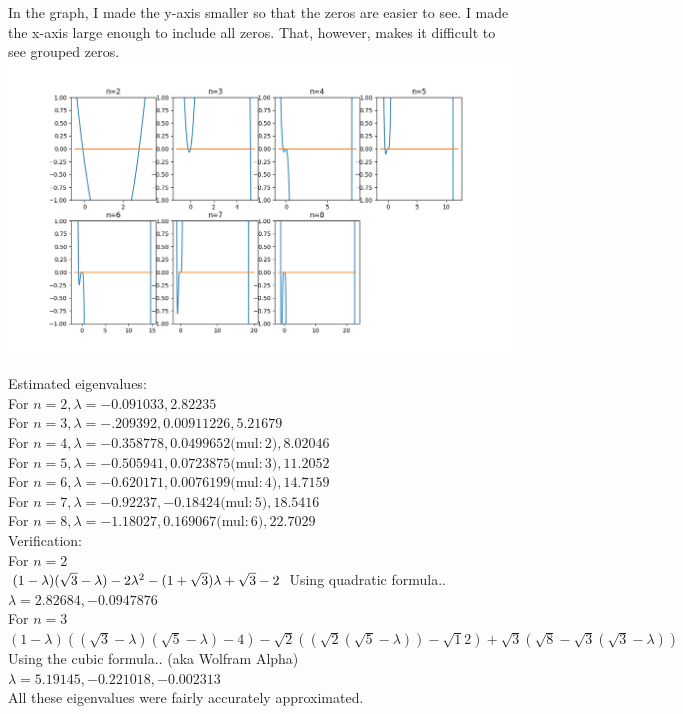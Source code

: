 \documentclass[12pt]{article}
\begin{document}
In the graph, I made the y-axis smaller so that the zeros are easier to see. I made the x-axis large enough to include all zeros. That, however, makes it difficult to see grouped zeros.
\includegraphics[width=\textwidth]{p3.png}

\noindent
Estimated eigenvalues:
\\
For $n=2, \lambda = -0.091033, 2.82235$ \\
For $n=3, \lambda = -.209392, 0.00911226, 5.21679$ \\
For $n=4, \lambda = -0.358778, 0.0499652 ($mul$: 2), 8.02046$ \\
For $n=5, \lambda = -0.505941, 0.0723875 ($mul$: 3), 11.2052$ \\
For $n=6, \lambda = -0.620171, 0.0076199 ($mul$: 4), 14.7159$ \\
For $n=7, \lambda = -0.92237, -0.18424 ($mul$: 5), 18.5416$ \\
For $n=8, \lambda = -1.18027, 0.169067 ($mul$: 6), 22.7029$ \\

\noindent
Verification:
\\
For $n=2$
\\
$
(1-\lambda)(\sqrt3-\lambda)-2
\\
\lambda^2-(1+\sqrt3)\lambda+\sqrt3-2
\\
$
Using quadratic formula..
$\lambda = 2.82684, -0.0947876$
\\
For $n=3$
\\
$(1-\lambda)((\sqrt3-\lambda)(\sqrt5-\lambda)-4)-\sqrt2((\sqrt2(\sqrt5-\lambda))-\sqrt12)+\sqrt3(\sqrt8-\sqrt3(\sqrt3-\lambda))$
\\
Using the cubic formula.. (aka Wolfram Alpha)
\\
$\lambda = 5.19145, -0.221018, -0.002313$
\\
All these eigenvalues were fairly accurately approximated.
\\
\end{document}
